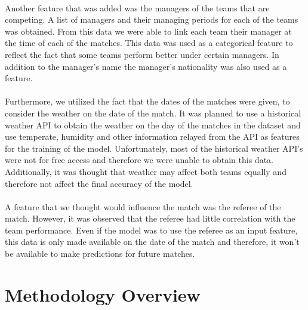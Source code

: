 \documentclass[a4paper,12pt]{article}
\begin{document}
	\\
	Another feature that was added was the managers of the teams that are competing. A list of managers and their managing periods for each of the teams was obtained. From this data we were able to link each team their manager at the time of each of the matches. This data was used as a categorical feature to reflect the fact that some teams perform better under certain managers. In addition to the manager’s name the manager’s nationality was also used as a feature. \\
	\\
	Furthermore, we utilized the fact that the dates of the matches were given, to consider the weather on the date of the match. It was planned to use a historical weather API to obtain the weather on the day of the matches in the dataset and use temperate, humidity and other information relayed from the API as features for the training of the model. Unfortunately, most of the historical weather API’s were not for free access and therefore we were unable to obtain this data. Additionally, it was thought that weather may affect both teams equally and therefore not affect the final accuracy of the model.\\
	\\
	A feature that we thought would influence the match was the referee of the match. However, it was observed that the referee had little correlation with the team performance. Even if the model was to use the referee as an input feature, this data is only made available on the date of the match and therefore, it won’t be available to make predictions for future matches.
	
	\section{Methodology Overview}
	
\end{document}
